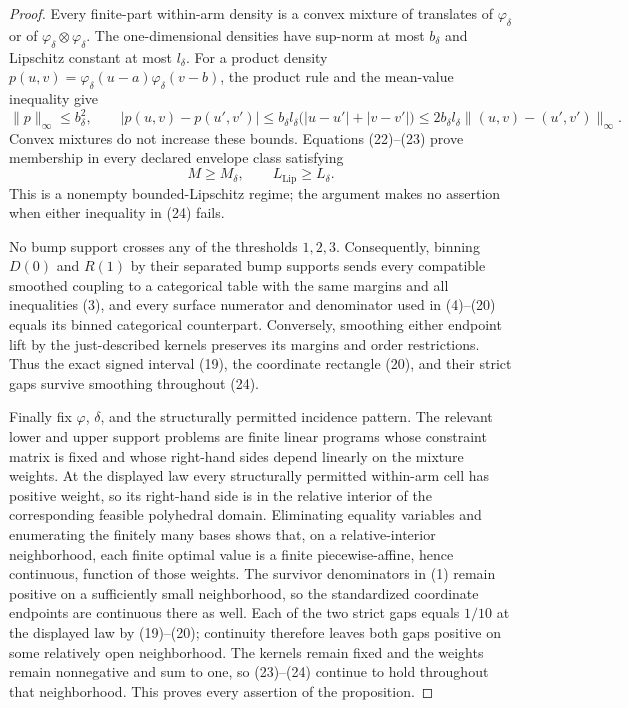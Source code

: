 \documentclass{article}
\begin{document}
\begin{proof}
Every finite-part within-arm density is a convex mixture of translates of \(\varphi_\delta\) or of \(\varphi_\delta\otimes\varphi_\delta\).  The one-dimensional densities have sup-norm at most \(b_\delta\) and Lipschitz constant at most \(l_\delta\).  For a product density \(p(u,v)=\varphi_\delta(u-a)\varphi_\delta(v-b)\), the product rule and the mean-value inequality give
\[
 \|p\|_\infty\leq b_\delta^2,\qquad
 |p(u,v)-p(u',v')|
 \leq b_\delta l_\delta\bigl(|u-u'|+|v-v'|\bigr)
 \leq2b_\delta l_\delta\|(u,v)-(u',v')\|_\infty. \tag{23}
\]
Convex mixtures do not increase these bounds.  Equations (22)--(23) prove membership in every declared envelope class satisfying
\[
 M\geq M_\delta,\qquad L_{\mathrm{Lip}}\geq L_\delta. \tag{24}
\]
This is a nonempty bounded-Lipschitz regime; the argument makes no assertion when either inequality in (24) fails.

No bump support crosses any of the thresholds \(1,2,3\).  Consequently, binning \(D(0)\) and \(R(1)\) by their separated bump supports sends every compatible smoothed coupling to a categorical table with the same margins and all inequalities (3), and every surface numerator and denominator used in (4)--(20) equals its binned categorical counterpart.  Conversely, smoothing either endpoint lift by the just-described kernels preserves its margins and order restrictions.  Thus the exact signed interval (19), the coordinate rectangle (20), and their strict gaps survive smoothing throughout (24).

Finally fix \(\varphi\), \(\delta\), and the structurally permitted incidence pattern.  The relevant lower and upper support problems are finite linear programs whose constraint matrix is fixed and whose right-hand sides depend linearly on the mixture weights.  At the displayed law every structurally permitted within-arm cell has positive weight, so its right-hand side is in the relative interior of the corresponding feasible polyhedral domain.  Eliminating equality variables and enumerating the finitely many bases shows that, on a relative-interior neighborhood, each finite optimal value is a finite piecewise-affine, hence continuous, function of those weights.  The survivor denominators in (1) remain positive on a sufficiently small neighborhood, so the standardized coordinate endpoints are continuous there as well.  Each of the two strict gaps equals \(1/10\) at the displayed law by (19)--(20); continuity therefore leaves both gaps positive on some relatively open neighborhood.  The kernels remain fixed and the weights remain nonnegative and sum to one, so (23)--(24) continue to hold throughout that neighborhood.  This proves every assertion of the proposition.
\end{proof}
\end{document}

